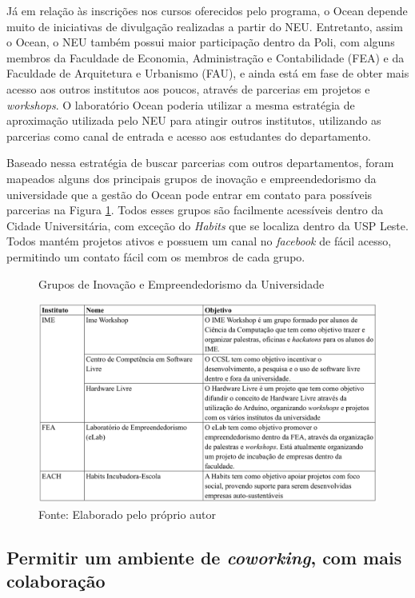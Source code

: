Já em relação às inscrições nos cursos oferecidos pelo programa, o Ocean depende muito de iniciativas de divulgação realizadas a partir do NEU. Entretanto, assim o Ocean, o NEU também possui maior participação dentro da Poli, com alguns membros da Faculdade de Economia, Administração e Contabilidade (FEA) e da Faculdade de Arquitetura e Urbanismo (FAU), e ainda está em fase de obter mais acesso aos outros institutos aos poucos, através de parcerias em projetos e \textit{workshops}. O laboratório Ocean poderia utilizar a mesma estratégia de aproximação utilizada pelo NEU para atingir outros institutos, utilizando as parcerias como canal de entrada e acesso aos estudantes do departamento.

Baseado nessa estratégia de buscar parcerias com outros departamentos, foram mapeados alguns dos principais grupos de inovação e empreendedorismo da universidade que a gestão do Ocean pode entrar em contato para possíveis parcerias na Figura \ref{fig:institutosuniversidade}. Todos esses grupos são facilmente acessíveis dentro da Cidade Universitária, com exceção do \textit{Habits} que se localiza dentro da USP Leste. Todos mantém projetos ativos e possuem um canal no \textit{facebook} de fácil acesso, permitindo um contato fácil com os membros de cada grupo.

\begin{figure}[H]
\caption{Grupos de Inovação e Empreendedorismo da Universidade}
\centerline{\includegraphics[scale=0.6]{img/institutosuniversidade}}
\label{fig:institutosuniversidade}
\caption* {Fonte: Elaborado pelo próprio autor}
\end{figure}

\subsection{Permitir um ambiente de \textit{coworking}, com mais colaboração}

